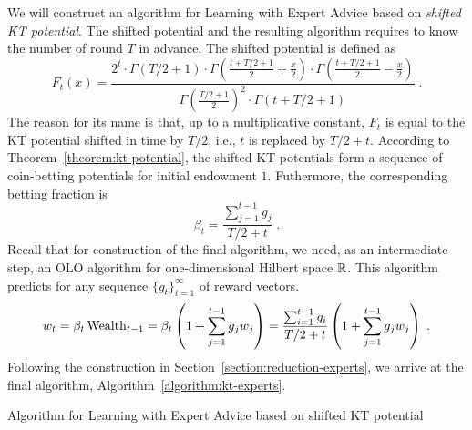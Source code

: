 We will construct an algorithm for Learning with Expert Advice based on
\emph{shifted KT potential}. The shifted potential and the resulting algorithm
requires to know the number of round $T$ in advance. The shifted potential is
defined as
$$
F_t(x) = \frac{2^t \cdot \Gamma\left(T/2 + 1 \right) \cdot \Gamma\left(\frac{t+T/2+1}{2} + \frac{x}{2} \right) \cdot \Gamma\left(\frac{t+T/2+1}{2} - \frac{x}{2} \right)}{\Gamma\left(\frac{T/2+1}{2} \right)^2 \cdot \Gamma \left(t+T/2+1\right)} \; .
$$
The reason for its name is that, up to a multiplicative constant, $F_t$ is equal
to the KT potential shifted in time by $T/2$, i.e., $t$ is replaced by $T/2+t$.
According to Theorem~\ref{theorem:kt-potential}, the shifted KT potentials form
a sequence of coin-betting potentials for initial endowment $1$. Futhermore, the
corresponding betting fraction is
$$
\beta_t = \frac{\sum_{j=1}^{t-1} g_j}{T/2+t} \; .
$$
Recall that for construction of the final algorithm, we need, as an intermediate
step, an OLO algorithm for one-dimensional Hilbert space $\mathbb{R}$. This algorithm
predicts for any sequence $\{g_t\}_{t=1}^\infty$ of reward vectors.
$$
w_t
= \beta_t \operatorname{Wealth}_{t-1}
= \beta_t \left(1 + \sum_{j=1}^{t-1} g_j w_j \right)
= \frac{\sum_{i=1}^{t-1} g_i}{T/2+t} \left(1 + \sum_{j=1}^{t-1} g_j w_j \right) \; .
$$
Following the construction in Section~\ref{section:reduction-experts}, we arrive
at the final algorithm, Algorithm~\ref{algorithm:kt-experts}.

\begin{algorithm}[t]
\begin{algorithmic}
\caption{Algorithm for Learning with Expert Advice based on shifted KT potential
\label{algorithm:kt-experts}}
{
\ENDFOR
}
\end{algorithmic}
\end{algorithm}


